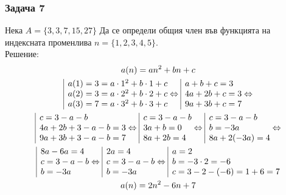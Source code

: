 \documentclass[fleqn, 12pt]{article}
\theoremstyle{definition}
\begin{document}
\subsubsection*{Задача 7}
Нека $A = \{3,3,7,15,27 \}$ Да се определи общия член във функцията на индексната променлива $n = \{1,2,3,4,5 \}$.\\
Решение: 
\begin{gather*}
a(n) = an^2 + bn + c \\
\begin{array}{|l@{}}
a(1) = 3 = a \cdot 1^2 + b \cdot 1 + c \\
a(2) = 3 = a \cdot 2^2 + b \cdot 2 + c \\
a(3) = 7 = a \cdot 3^2 + b \cdot 3 + c 
\end{array} \Leftrightarrow 
\begin{array}{|l@{}}
a + b + c = 3\\
4a + 2b + c  = 3\\
9a + 3b + c  = 7
\end{array}\Leftrightarrow  \\
\begin{array}{|l@{}}
c = 3 - a -b\\
4a + 2b + 3 - a -b  = 3\\
9a + 3b + 3 - a -b  = 7
\end{array}\Leftrightarrow  
\begin{array}{|l@{}}
c = 3 - a -b\\
3a + b = 0\\
8a + 2b= 4
\end{array}\Leftrightarrow 
\begin{array}{|l@{}}
c = 3 - a -b\\
b = -3a\\
8a + 2(-3a)= 4
\end{array} \Leftrightarrow  \\
\begin{array}{|l@{}}
8a -6a= 4\\
c = 3 - a -b\\
b = -3a
\end{array} \Leftrightarrow
\begin{array}{|l@{}}
2a= 4\\
c = 3 - a -b\\
b = -3a
\end{array} 
 \Leftrightarrow
\begin{array}{|l@{}}
a= 2\\
b = -3 \cdot 2 = -6\\
c = 3 - 2 -(-6) = 1+6 = 7
\end{array}\\
a(n) = 2n^2 - 6n + 7 
\end{gather*}
\end{document}
